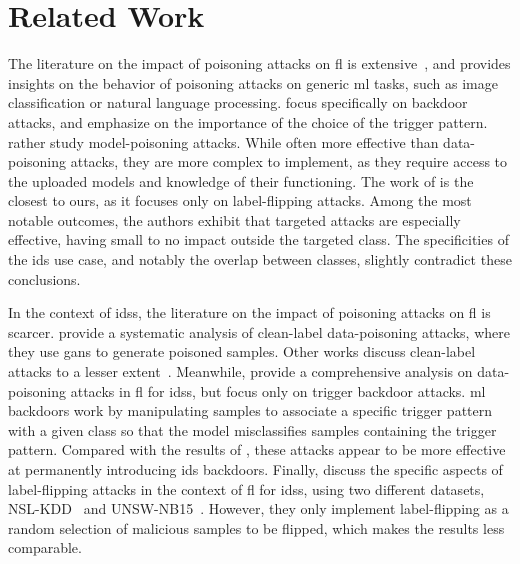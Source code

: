 \section{Related Work\label{sec:assess.related}}

The literature on the impact of poisoning attacks on \gls{fl} is extensive~\cite{bhagoji_AnalyzingFederatedLearning_2019,tolpegin_DataPoisoningAttacks_2020,nuding_DataPoisoningSequential_2022,sun_DataPoisoningAttacks_2022}, and provides insights on the behavior of poisoning attacks on generic \gls{ml} tasks, such as image classification or natural language processing.
\Textcite{nuding_DataPoisoningSequential_2022} focus specifically on backdoor attacks, and emphasize on the importance of the choice of the trigger pattern. 
\Textcite{sun_DataPoisoningAttacks_2022,fang_LocalModelPoisoning_2020} rather study model-poisoning attacks. %
While often more effective than data-poisoning attacks, they are more complex to implement, as they require access to the uploaded models and knowledge of their functioning.
The work of \textcite{tolpegin_DataPoisoningAttacks_2020} is the closest to ours, as it focuses only on label-flipping attacks.
Among the most notable outcomes, the authors exhibit that targeted attacks are especially effective, having small to no impact outside the targeted class.
The specificities of the \gls{ids} use case, and notably the overlap between classes, slightly contradict these conclusions.

In the context of \glspl{ids}, the literature on the impact of poisoning attacks on \gls{fl} is scarcer.
\Textcite{zhang_Evaluationdatapoisoning_2022} provide a systematic analysis of clean-label data-poisoning attacks, where they use \glspl{gan} to generate poisoned samples. 
Other works discuss clean-label attacks to a lesser extent~\cite{nguyen_PoisoningAttacksFederated_2020b,vy_FederatedLearningBasedIntrusion_2021}.
Meanwhile, \textcite{merzouk_Parameterizingpoisoningattacks_2023} provide a comprehensive analysis on data-poisoning attacks in \gls{fl} for \glspl{ids}, but focus only on trigger backdoor attacks.
\Gls{ml} backdoors work by manipulating samples to associate a specific trigger pattern with a given class so that the model misclassifies samples containing the trigger pattern.
Compared with the results of , these attacks appear to be more effective at permanently introducing \gls{ids} backdoors.
Finally, \textcite{yang_Dependablefederatedlearning_2023} discuss the specific aspects of label-flipping attacks in the context of \gls{fl} for \glspl{ids}, using two different datasets, NSL-KDD~\cite{tavallaee_detailedanalysisKDD_2009} and UNSW-NB15~\cite{moustafa_UNSWNB15comprehensivedata_2015}.
However, they only implement label-flipping as a random selection of malicious samples to be flipped, which makes the results less comparable.

